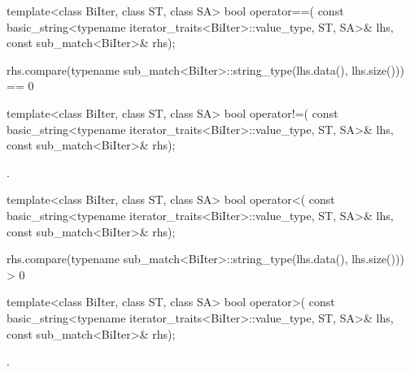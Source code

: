 %
\begin{itemdecl}
template<class BiIter, class ST, class SA>
  bool operator==(
    const basic_string<typename iterator_traits<BiIter>::value_type, ST, SA>& lhs,
    const sub_match<BiIter>& rhs);
\end{itemdecl}

\begin{itemdescr}
\pnum
\returns
\begin{codeblock}
rhs.compare(typename sub_match<BiIter>::string_type(lhs.data(), lhs.size())) == 0
\end{codeblock}
\end{itemdescr}

%
\begin{itemdecl}
template<class BiIter, class ST, class SA>
  bool operator!=(
      const basic_string<typename iterator_traits<BiIter>::value_type, ST, SA>& lhs,
      const sub_match<BiIter>& rhs);
\end{itemdecl}

\begin{itemdescr}
\pnum\returns {}.
\end{itemdescr}

%
\begin{itemdecl}
template<class BiIter, class ST, class SA>
  bool operator<(
      const basic_string<typename iterator_traits<BiIter>::value_type, ST, SA>& lhs,
      const sub_match<BiIter>& rhs);
\end{itemdecl}

\begin{itemdescr}
\pnum
\returns
\begin{codeblock}
rhs.compare(typename sub_match<BiIter>::string_type(lhs.data(), lhs.size())) > 0
\end{codeblock}
\end{itemdescr}

%
\begin{itemdecl}
template<class BiIter, class ST, class SA>
  bool operator>(
      const basic_string<typename iterator_traits<BiIter>::value_type, ST, SA>& lhs,
      const sub_match<BiIter>& rhs);
\end{itemdecl}

\begin{itemdescr}
\pnum\returns {}.
\end{itemdescr}

